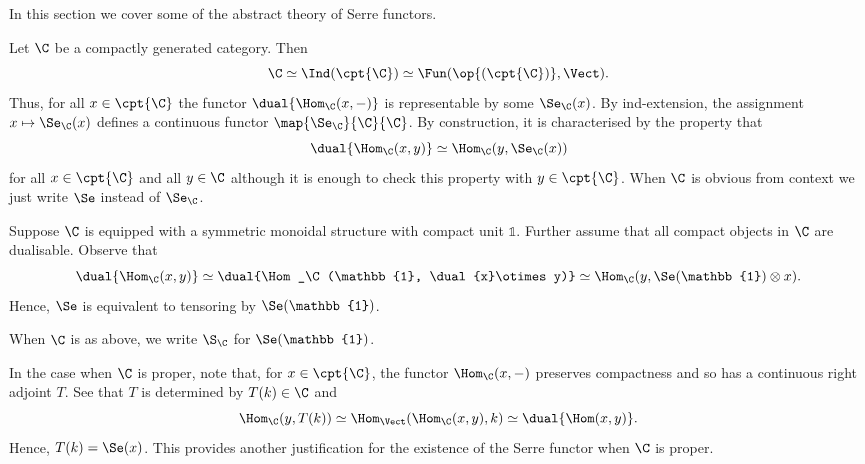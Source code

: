 \documentclass{amsart}
\begin{document}
  \label{sec:serre_general}

  In this section we cover some of the abstract theory
  of Serre functors.


  \sssec{}

  Let \(\C\) be a compactly generated category. Then
  \begin{displaymath}
    \C \simeq \Ind(\cpt{\C}) \simeq \Fun(\op{(\cpt{\C})}, \Vect).
  \end{displaymath}
  Thus, for all \(x \in \cpt{\C}\) the functor \(\dual{\Hom_\C(x, -)}\)
  is representable by some \(\Se_\C(x)\). By ind-extension,
  the assignment \(x \mapsto \Se_\C(x)\) defines a
  continuous functor \(\map{\Se_\C}{\C}{\C}\). By construction,
  it is characterised by the property that
  \begin{displaymath}
    \dual{\Hom_\C(x,y)} \simeq \Hom_\C(y, \Se_\C(x))
  \end{displaymath}
  for all \(x \in \cpt{\C}\) and all \(y \in \C\)
  although it is enough to check this property
  with \(y \in \cpt{\C}\). When \(\C\) is obvious
  from context we just write \(\Se\) instead of \(\Se_\C\).

  \sssec{}

  Suppose \(\C\) is equipped with a symmetric monoidal
  structure with compact unit \(\mathbb{1}\). Further assume
  that all compact objects in \(\C\) are dualisable. Observe that
  \begin{displaymath}
    \dual{\Hom_\C(x,y)} \simeq \dual{\Hom_\C(\mathbb{1}, \dual{x}\otimes y)} \simeq \Hom_\C(y, \Se(\mathbb{1})\otimes x).
  \end{displaymath}
  Hence, \(\Se\) is equivalent to tensoring by \(\Se(\mathbb{1})\).

  \begin{notat}
    When \(\C\) is as above, we write \(\S_\C\) for \(\Se(\mathbb{1})\).
  \end{notat}

  \sssec{}

  In the case when \(\C\) is proper, note that, for \(x \in \cpt{\C}\),
  the functor \(\Hom_\C(x, -)\) preserves compactness and
  so has  a continuous right adjoint \(T\). See that \(T\)
  is determined by \(T(k) \in \C\) and 
  \begin{displaymath}
    \Hom_\C(y, T(k)) \simeq \Hom_\Vect(\Hom_\C(x,y), k) \simeq \dual{\Hom(x,y)}.
  \end{displaymath}
  Hence, \(T(k) = \Se(x)\). This provides another justification
  for the existence of the Serre functor when \(\C\) is proper.
\end{document}
